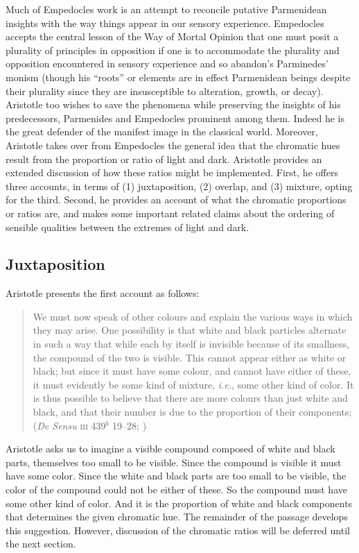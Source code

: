 Much of Empedocles work is an attempt to reconcile putative Parmenidean insights with the way things appear in our sensory experience. Empedocles accepts the central lesson of the Way of Mortal Opinion that one must posit a plurality of principles in opposition if one is to accommodate the plurality and opposition encountered in sensory experience and so abandon's Parminedes' monism (though his ``roots'' or elements are in effect Parmenidean beings despite their plurality since they are insusceptible to alteration, growth, or decay). Aristotle too wishes to save the phenomena while preserving the insights of his predecessors, Parmenides and Empedocles prominent among them. Indeed he is the great defender of the manifest image in the classical world. Moreover, Aristotle takes over from Empedocles the general idea that the chromatic hues result from the proportion or ratio of light and dark. Aristotle provides an extended discussion of how these ratios might be implemented. First, he offers three accounts, in terms of (1) juxtaposition, (2) overlap, and (3) mixture, opting for the third. Second, he provides an account of what the chromatic proportions or ratios are, and makes some important related claims about the ordering of sensible qualities between the extremes of light and dark.

\subsection{Juxtaposition} %
\label{sub:juxtaposition}

Aristotle presents the first account as follows:
\begin{quote}
    We must now speak of other colours and explain the various ways in which they may arise. One possibility is that white and black particles alternate in such a way that while each by itself is invisible because of its smallness, the compound of the two  is visible. This cannot appear either as white or black; but since it must have some colour, and cannot have either of these, it must evidently be some kind of mixture, \emph{i.e.}, some other kind of color. It is thus possible to believe that there are more colours than just white and black, and that their number is due to the proportion of their components; (\emph{De Sensu} \textsc{iii} 439\( ^{b} \) 19--28; \citealt[238]{Hett:1936fk})
\end{quote}
Aristotle asks us to imagine a visible compound composed of white and black parts, themselves too small to be visible. Since the compound is visible it must have some color. Since the white and black parts are too small to be visible, the color of the compound could not be either of these. So the compound must have some other kind of color. And it is the proportion of white and black components that determines the given chromatic hue. The remainder of the passage develops this suggestion. However, discussion of the chromatic ratios will be deferred until the next section.

